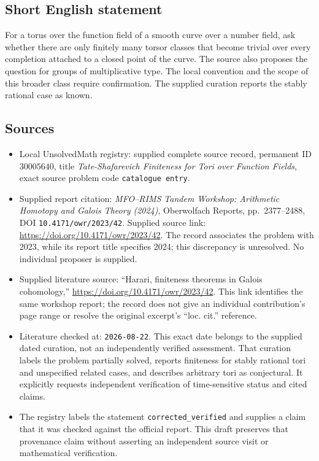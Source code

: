 \documentclass[11pt]{article}
\begin{document}
\subsection{Short English statement}
For a torus over the function field of a smooth curve over a number field, ask whether there are only finitely many torsor classes that become trivial over every completion attached to a closed point of the curve. The source also proposes the question for groups of multiplicative type. The local convention and the scope of this broader class require confirmation. The supplied curation reports the stably rational case as known.
\subsection{Sources}
\begin{itemize}
\item Local UnsolvedMath registry: supplied complete source record, permanent ID \(30005640\), title \emph{Tate-Shafarevich Finiteness for Tori over Function Fields}, exact source problem code \texttt{catalogue entry}.
\item Supplied report citation: \emph{MFO--RIMS Tandem Workshop: Arithmetic Homotopy and Galois Theory (2024)}, Oberwolfach Reports, pp.\ 2377--2488, DOI \texttt{10.4171/owr/2023/42}. Supplied source link: \url{https://doi.org/10.4171/owr/2023/42}. The record associates the problem with 2023, while its report title specifies 2024; this discrepancy is unresolved. No individual proposer is supplied.
\item Supplied literature source: ``Harari, finiteness theorems in Galois cohomology,'' \url{https://doi.org/10.4171/owr/2023/42}. This link identifies the same workshop report; the record does not give an individual contribution's page range or resolve the original excerpt's ``loc. cit.'' reference.
\item Literature checked at: \texttt{2026-08-22}. This exact date belongs to the supplied dated curation, not an independently verified assessment. That curation labels the problem partially solved, reports finiteness for stably rational tori and unspecified related cases, and describes arbitrary tori as conjectural. It explicitly requests independent verification of time-sensitive status and cited claims.
\item The registry labels the statement \texttt{corrected\_verified} and supplies a claim that it was checked against the official report. This draft preserves that provenance claim without asserting an independent source visit or mathematical verification.
\end{itemize}
\end{document}
